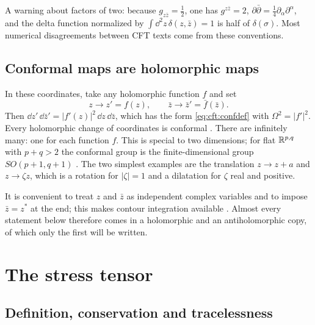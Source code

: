 A warning about factors of two: because $g_{z\bar z}=\tfrac12$, one has $g^{z\bar z}=2$,
$\partial\bar\partial=\tfrac14\partial_\alpha\partial^\alpha$, and the delta function normalized
by $\int\dd^2z\,\delta(z,\bar z)=1$ is half of $\delta(\sigma)$. Most numerical disagreements
between CFT texts come from these conventions.

\subsection{Conformal maps are holomorphic maps}

In these coordinates, take any holomorphic function $f$ and set
\begin{equation}\label{eq:cft:holo}
  z\to z'=f(z),\qquad \bar z\to\bar z'=\bar f(\bar z).
\end{equation}
Then $\dd z'\,\dd\bar z'=|f'(z)|^2\,\dd z\,\dd\bar z$, which has the form
\eqref{eq:cft:confdef} with $\Omega^2=|f'|^2$. Every holomorphic change of coordinates is
conformal . There are infinitely many: one for each
function $f$. This is special to two dimensions; for flat $\mathbb{R}^{p,q}$ with $p+q>2$ the conformal
group is the finite-dimensional group $SO(p+1,q+1)$ . The
two simplest examples are the translation $z\to z+a$ and $z\to\zeta z$, which is a rotation for
$|\zeta|=1$ and a dilatation for $\zeta$ real and positive.

It is convenient to treat $z$ and $\bar z$ as independent complex variables and to impose
$\bar z=z^*$ at the end; this makes contour integration available
. Almost every statement below therefore comes in a
holomorphic and an antiholomorphic copy, of which only the first will be written.

\section{The stress tensor}\label{sec:cft:stress}

\subsection{Definition, conservation and tracelessness}

